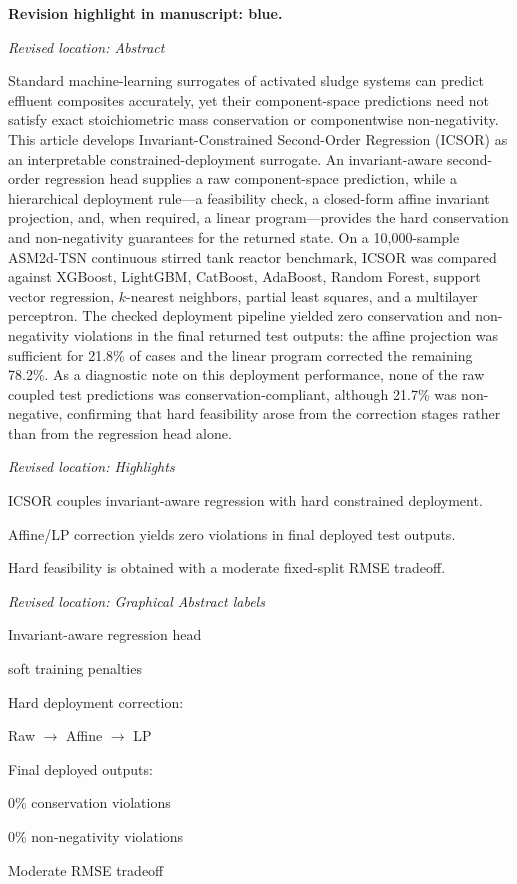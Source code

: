 \documentclass[11pt,a4paper]{article}
\newcommand{\revisionnotice}{\par\noindent\textcolor{revisionblue}{\textbf{Revision highlight in manuscript: blue.}}\par}
\newcommand{\excerptlocation}[1]{\par\noindent\textit{Revised location: #1}\par}
\begin{document}
\revisionnotice

\excerptlocation{Abstract}
\begin{revisionexcerpt}
Standard machine-learning surrogates of activated sludge systems can predict effluent composites accurately, yet their component-space predictions need not satisfy exact stoichiometric mass conservation or componentwise non-negativity. This article develops Invariant-Constrained Second-Order Regression (ICSOR) as an interpretable constrained-deployment surrogate. An invariant-aware second-order regression head supplies a raw component-space prediction, while a hierarchical deployment rule---a feasibility check, a closed-form affine invariant projection, and, when required, a linear program---provides the hard conservation and non-negativity guarantees for the returned state. On a 10,000-sample ASM2d-TSN continuous stirred tank reactor benchmark, ICSOR was compared against XGBoost, LightGBM, CatBoost, AdaBoost, Random Forest, support vector regression, $k$-nearest neighbors, partial least squares, and a multilayer perceptron. The checked deployment pipeline yielded zero conservation and non-negativity violations in the final returned test outputs: the affine projection was sufficient for 21.8\% of cases and the linear program corrected the remaining 78.2\%. As a diagnostic note on this deployment performance, none of the raw coupled test predictions was conservation-compliant, although 21.7\% was non-negative, confirming that hard feasibility arose from the correction stages rather than from the regression head alone.
\end{revisionexcerpt}

\excerptlocation{Highlights}
\begin{revisionexcerpt}
ICSOR couples invariant-aware regression with hard constrained deployment.

Affine/LP correction yields zero violations in final deployed test outputs.

Hard feasibility is obtained with a moderate fixed-split RMSE tradeoff.
\end{revisionexcerpt}

\excerptlocation{Graphical Abstract labels}
\begin{revisionexcerpt}
Invariant-aware regression head

soft training penalties

Hard deployment correction:

Raw $\rightarrow$ Affine $\rightarrow$ LP

Final deployed outputs:

0\% conservation violations

0\% non-negativity violations

Moderate RMSE tradeoff
\end{revisionexcerpt}
\end{document}

